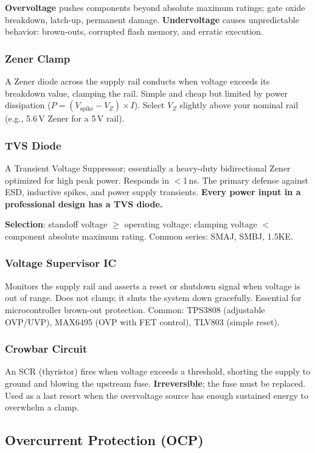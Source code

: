 \textbf{Overvoltage} pushes components beyond absolute maximum ratings; gate oxide breakdown, latch-up, permanent damage. \textbf{Undervoltage} causes unpredictable behavior: brown-outs, corrupted flash memory, and erratic execution.

\subsubsection{Zener Clamp}
A Zener diode across the supply rail conducts when voltage exceeds its breakdown value, clamping the rail. Simple and cheap but limited by power dissipation ($P = (V_{\text{spike}} - V_Z) \times I$). Select $V_Z$ slightly above your nominal rail (e.g., 5.6\,V Zener for a 5\,V rail).

\subsubsection{TVS Diode}
A Transient Voltage Suppressor; essentially a heavy-duty bidirectional Zener optimized for high peak power. Responds in $<$1\,ns. The primary defense against ESD, inductive spikes, and power supply transients. \textbf{Every power input in a professional design has a TVS diode.}

\textbf{Selection}: standoff voltage $\geq$ operating voltage; clamping voltage $<$ component absolute maximum rating. Common series: SMAJ, SMBJ, 1.5KE.

\subsubsection{Voltage Supervisor IC}
Monitors the supply rail and asserts a reset or shutdown signal when voltage is out of range. Does not clamp; it shuts the system down gracefully. Essential for microcontroller brown-out protection. Common: TPS3808 (adjustable OVP/UVP), MAX6495 (OVP with FET control), TLV803 (simple reset).

\subsubsection{Crowbar Circuit}
An SCR (thyristor) fires when voltage exceeds a threshold, shorting the supply to ground and blowing the upstream fuse. \textbf{Irreversible}; the fuse must be replaced. Used as a last resort when the overvoltage source has enough sustained energy to overwhelm a clamp.


\subsection{Overcurrent Protection (OCP)}
\label{sec:ocp}


